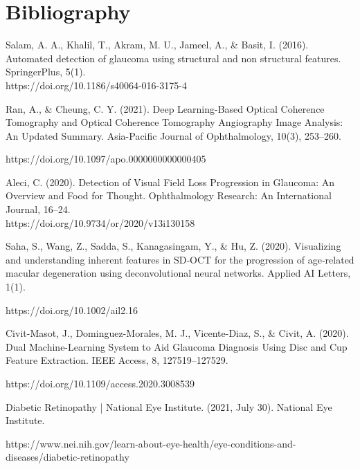\justifying
\section*{Bibliography} 
\noindent[1] Salam, A. A., Khalil, T., Akram, M. U., Jameel, A., & Basit, I. (2016). Automated detection of glaucoma using structural and non structural features. SpringerPlus, 5(1).\\ https://doi.org/10.1186/s40064-016-3175-4

\vspace{5mm}
\noindent[2] Ran, A., & Cheung, C. Y. (2021). Deep Learning-Based Optical Coherence Tomography and Optical Coherence Tomography Angiography Image Analysis: An Updated Summary. Asia-Pacific Journal of Ophthalmology, 10(3), 253–260. 

\noindent https://doi.org/10.1097/apo.0000000000000405

\vspace{5mm}
\noindent[3] Aleci, C. (2020). Detection of Visual Field Loss Progression in Glaucoma: An Overview and Food for Thought. Ophthalmology Research: An International Journal, 16–24.\\
https://doi.org/10.9734/or/2020/v13i130158

\vspace{5mm}
\noindent[4] Saha, S., Wang, Z., Sadda, S., Kanagasingam, Y., & Hu, Z. (2020). Visualizing and understanding inherent features in SD‐OCT for the progression of age‐related macular degeneration using deconvolutional neural networks. Applied AI Letters, 1(1). 

\noindent https://doi.org/10.1002/ail2.16
 
\vspace{5mm}
\noindent[5] Civit-Masot, J., Dominguez-Morales, M. J., Vicente-Diaz, S., & Civit, A. (2020). Dual Machine-Learning System to Aid Glaucoma Diagnosis Using Disc and Cup Feature Extraction. IEEE Access, 8, 127519–127529. 

\noindent https://doi.org/10.1109/access.2020.3008539

\vspace{5mm}
\noindent[6] Diabetic Retinopathy | National Eye Institute. (2021, July 30). National Eye Institute. 

\noindent https://www.nei.nih.gov/learn-about-eye-health/eye-conditions-and-diseases/diabetic-retinopathy

